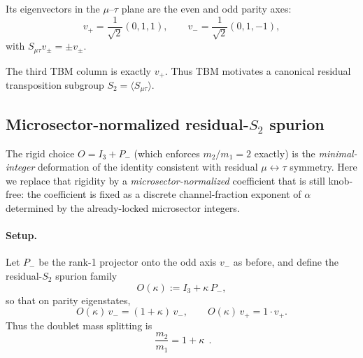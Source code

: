 Its eigenvectors in the $\mu$--$\tau$ plane are the even and odd parity axes:
\begin{equation}
v_+ = \frac{1}{\sqrt{2}}(0,1,1), \qquad v_- = \frac{1}{\sqrt{2}}(0,1,-1),
\end{equation}
with $S_{\mu\tau} v_\pm = \pm v_\pm$.

The third TBM column is exactly $v_+$. Thus TBM motivates a canonical residual 
transposition subgroup $S_2 = \langle S_{\mu\tau} \rangle$.

\subsection{Microsector-normalized residual-$S_2$ spurion}\label{app:nu-minimal}

The rigid choice $O = I_3 + P_-$ (which enforces $m_2/m_1=2$ exactly) is the
\emph{minimal-integer} deformation of the identity consistent with residual
$\mu\leftrightarrow\tau$ symmetry.  Here we replace that rigidity by a
\emph{microsector-normalized} coefficient that is still knob-free: the coefficient
is fixed as a discrete channel-fraction exponent of $\alpha$ determined by the
already-locked microsector integers.

\paragraph{Setup.}
Let $P_-$ be the rank-1 projector onto the odd axis $v_-$ as before, and define
the residual-$S_2$ spurion family
\begin{equation}
O(\kappa) := I_3 + \kappa\,P_- ,
\end{equation}
so that on parity eigenstates,
\begin{equation}
O(\kappa)\,v_- = (1+\kappa)\,v_- ,\qquad
O(\kappa)\,v_+ = 1\cdot v_+ .
\end{equation}
Thus the doublet mass splitting is
\begin{equation}
\boxed{\;\frac{m_2}{m_1} = 1+\kappa\;}\, .
\end{equation}

